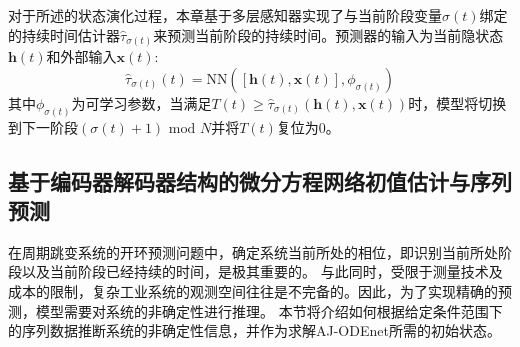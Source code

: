 对于所述的状态演化过程，本章基于多层感知器实现了与当前阶段变量${\sigma(t)}$绑定的持续时间估计器$\hat{\tau}_{{\sigma(t)}}$来预测当前阶段的持续时间。预测器的输入为当前隐状态$\boldsymbol{h}(t)$和外部输入$\boldsymbol{x}(t)$:
\begin{equation}
\hat{\tau}_{\sigma(t)}(t)=\text{NN}\left([\boldsymbol{h}(t), \boldsymbol{x}(t)], \phi_{\sigma(t)}\right)
\end{equation}
其中$\phi_{\sigma(t)}$为可学习参数，当满足$T(t)\geq\hat{\tau}_{\sigma(t)}(\boldsymbol{h}(t),\boldsymbol{x}(t))$时，模型将切换到下一阶段$(\sigma(t)+1)\text{ mod } N$并将$T(t)$复位为0。
\subsection{基于编码器解码器结构的微分方程网络初值估计与序列预测}
\label{sec:encoder_decoder}
在周期跳变系统的开环预测问题中，确定系统当前所处的相位，即识别当前所处阶段以及当前阶段已经持续的时间，是极其重要的。
与此同时，受限于测量技术及成本的限制，复杂工业系统的观测空间往往是不完备的。因此，为了实现精确的预测，模型需要对系统的非确定性进行推理。
本节将介绍如何根据给定条件范围下的序列数据推断系统的非确定性信息，并作为求解AJ-ODEnet所需的初始状态。


